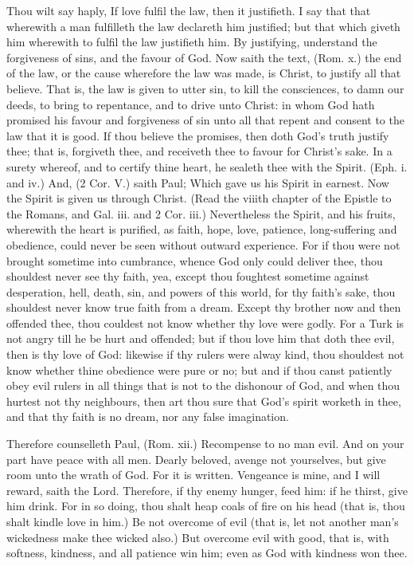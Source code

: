 Thou wilt say haply, If love fulfil the law, then it justifieth.
I say that that wherewith a man fulfilleth the 
law declareth him justified; but that which giveth him 
wherewith to fulfil the law justifieth him. By justifying, 
understand the forgiveness of sins, and the favour of God.
Now saith the text, (Rom. x.) the end of the law, or the 
cause wherefore the law was made, is Christ, to justify 
all that believe. That is, the law is given to utter sin, to 
kill the consciences, to damn our deeds, to bring to repentance,
and to drive unto Christ: in whom God hath 
promised his favour and forgiveness of sin unto all that 
repent and consent to the law that it is good. If thou believe
the promises, then doth God's truth justify thee;
that is, forgiveth thee, and receiveth thee to favour for 
Christ's sake. In a surety whereof, and to certify thine 
heart, he sealeth thee with the Spirit. (Eph. i. and iv.) And, 
(2 Cor. V.) saith Paul; Which gave us his Spirit in earnest. 
Now the Spirit is given us through Christ. (Read the 
viiith chapter of the Epistle to the Romans, and Gal. iii. 
and 2 Cor. iii.) Nevertheless the Spirit, and his fruits, 
wherewith the heart is purified, as faith, hope, love, patience,
long-suffering and obedience, could never be 
seen without outward experience. For if thou were not 
brought sometime into cumbrance, whence God only 
could deliver thee, thou shouldest never see thy faith, yea, 
except thou foughtest sometime against desperation, hell, 
death, sin, and powers of this world, for thy faith's 
sake, thou shouldest never know true faith from a 
dream. Except thy brother now and then offended thee, 
thou couldest not know whether thy love were godly. 
For a Turk is not angry till he be hurt and offended;
but if thou love him that doth thee evil, then is thy 
love of God: likewise if thy rulers were alway kind, thou 
shouldest not know whether thine obedience were pure 
or no; but and if thou canst patiently obey evil rulers in 
all things that is not to the dishonour of God, and when 
thou hurtest not thy neighbours, then art thou sure that 
God's spirit worketh in thee, and that thy faith is no dream, 
nor any false imagination. 

Therefore counselleth Paul, (Rom. xii.) Recompense 
to no man evil. And on your part have peace with all 
men. Dearly beloved, avenge not yourselves, but give 
room unto the wrath of God. For it is written. Vengeance
is mine, and I will reward, saith the Lord. Therefore,
if thy enemy hunger, feed him: if he thirst, give 
him drink. For in so doing, thou shalt heap coals of fire 
on his head (that is, thou shalt kindle love in him.) Be 
not overcome of evil (that is, let not another man's wickedness
make thee wicked also.) But overcome evil with 
good, that is, with softness, kindness, and all patience 
win him; even as God with kindness won thee.

